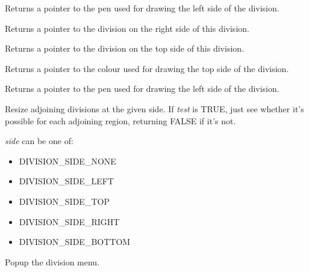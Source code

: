 Returns a pointer to the pen used for drawing the left side of the division.



Returns a pointer to the division on the right side of this division.



Returns a pointer to the division on the top side of this division.



Returns a pointer to the colour used for drawing the top side of the division.



Returns a pointer to the pen used for drawing the left side of the division.



Resize adjoining divisions at the given side. If {\it test} is TRUE,
just see whether it's possible for each adjoining region,
returning FALSE if it's not.

{\it side} can be one of:

\begin{itemize}\itemsep=0pt
\item DIVISION\_SIDE\_NONE
\item DIVISION\_SIDE\_LEFT
\item DIVISION\_SIDE\_TOP
\item DIVISION\_SIDE\_RIGHT
\item DIVISION\_SIDE\_BOTTOM
\end{itemize}



Popup the division menu.



